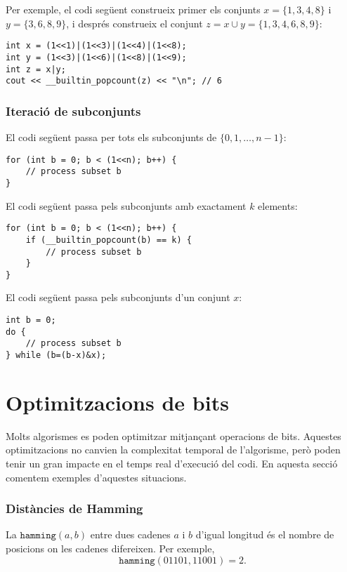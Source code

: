 Per exemple, el codi següent construeix primer els conjunts
$x=\{1,3,4,8\}$ i $y=\{3,6,8,9\}$, i després construeix el conjunt $z
= x \cup y = \{1,3,4,6,8,9\}$:


\begin{lstlisting}
int x = (1<<1)|(1<<3)|(1<<4)|(1<<8);
int y = (1<<3)|(1<<6)|(1<<8)|(1<<9);
int z = x|y;
cout << __builtin_popcount(z) << "\n"; // 6
\end{lstlisting}


\subsubsection{Iteració de subconjunts}

El codi següent passa per tots els subconjunts de
$\{0,1,\ldots,n-1\}$:


\begin{lstlisting}
for (int b = 0; b < (1<<n); b++) {
    // process subset b
}
\end{lstlisting}
El codi següent passa pels subconjunts amb exactament $k$ elements:
\begin{lstlisting}
for (int b = 0; b < (1<<n); b++) {
    if (__builtin_popcount(b) == k) {
        // process subset b
    }
}
\end{lstlisting}
El codi següent passa pels subconjunts d'un conjunt $x$:
\begin{lstlisting}
int b = 0;
do {
    // process subset b
} while (b=(b-x)&x);
\end{lstlisting}


\section{Optimitzacions de bits}

Molts algorismes es poden optimitzar mitjançant operacions de
bits. Aquestes optimitzacions no canvien la complexitat temporal de
l'algorisme, però poden tenir un gran impacte en el temps real
d'execució del codi. En aquesta secció comentem exemples d'aquestes
situacions.

\subsubsection{Distàncies de Hamming}

 La 
$\texttt{hamming}(a,b)$ entre dues cadenes $a$ i $b$ d'igual longitud
és el nombre de posicions on les cadenes difereixen. Per exemple,
\[\texttt{hamming}(01101,11001)=2.\]


